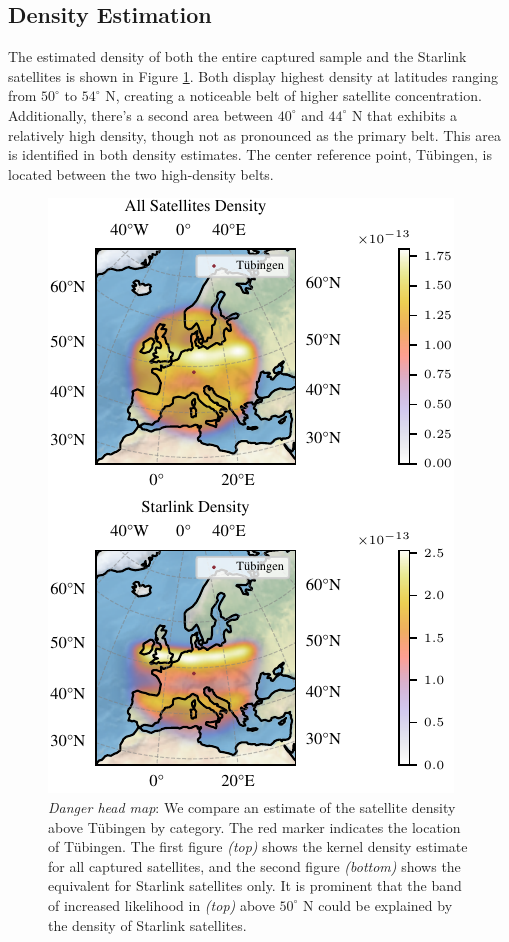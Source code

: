 \documentclass{article}
\theoremstyle{plain}
\theoremstyle{definition}
\theoremstyle{remark}
\begin{document}
\subsection{Density Estimation}
The estimated density of both the entire captured sample and the Starlink satellites is shown in Figure \ref{fig:density}. Both display highest density at latitudes ranging from $50^\circ$ to $54^\circ$ N, creating a noticeable belt of higher satellite concentration. Additionally, there's a second area between $40^\circ$ and $44^\circ$ N that exhibits a relatively high density, though not as pronounced as the primary belt. This area is identified in both density estimates. The center reference point, Tübingen, is located between the two high-density belts. 
\begin{figure}[h]
    \begin{center}
        \includegraphics{fig/density_comparison.pdf}
        \caption{\textit{Danger head map}: We compare an estimate of the satellite density above Tübingen by category. The red marker indicates the location of Tübingen. The first figure \textit{(top)} shows the kernel density estimate for all captured satellites, and the second figure \textit{(bottom)} shows the equivalent for Starlink satellites only.  It is prominent that the band of increased likelihood in \textit{(top)} above $50^\circ$ N could be explained by the density of Starlink satellites.}
        \label{fig:density}
    \end{center}
\end{figure}
\end{document}
